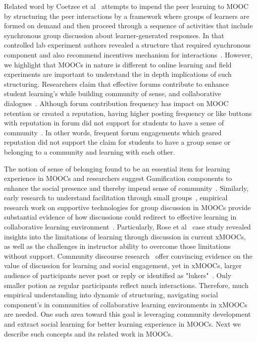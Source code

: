 \documentclass[format=acmsmall, review=false, screen=true]{acmart}
\begin{document}
Related word by Coetzee et al~\cite{coetzee2015structuring} attempts to impend the peer learning to MOOC by structuring the peer interactions by a framework where groups of learners are formed on demand and then proceed through a sequence of activities that include synchronous group discussion about learner-generated responses. In that controlled lab experiment authors revealed a structure that required synchronous component and also recommend incentives mechanism for interactions~\cite{coetzee2015structuring}. However, we highlight that MOOCs in nature is different to online learning and field experiments are important to understand the in depth implications of such structuring. Researchers claim that effective forums contribute to enhance student learning's while building community of sense, and collaborative dialogues~\cite{luca2004using}. Although forum contribution frequency has impact on MOOC retention or created a reputation, having higher posting frequency or like buttons with reputation in forum did not support for students to have a sense of community~\cite{coetzee2014should}. In other words, frequent forum engagements which geared reputation did not support the claim for students to have a group sense or belonging to a community and learning with each other.

The notion of sense of belonging found to be an essential item for learning experience in MOOCs and researchers suggest Gamification components to enhance the social presence and thereby impend sense of community~\cite{antonaci2019gamification}. Similarly, early research to understand facilitation through small groups~\cite{lim2014initial}, empirical research work on supportive technologies for group discussion in MOOCs provide substantial evidence of how discussions could redirect to effective learning in collaborative learning environment~\cite{rose2015supportive}. Particularly, Rose et al~\cite{rose2015supportive} case study revealed insights into the limitations of learning through discussion in current xMOOCs, as
well as the challenges in instructor ability to overcome those limitations without support. Community discourse research~\cite{mitchell2011profound,resnick2015socializing} offer convincing evidence on the value of discussion for learning and social engagement, yet in xMOOCs, larger audience of participants never post or reply or identified as "lukers"~\cite{ferguson2015examining,clow2013moocs}. Only smaller potion as regular participants reflect much interactions. Therefore, much empirical understanding into dynamic of structuring, navigating social component's in communities of collaborative learning environments in xMOOCs are needed. One such area toward this goal is leveraging community development and extract social learning for better learning experience in MOOCs. Next we describe such concepts and its related work in MOOCs.
\end{document}
